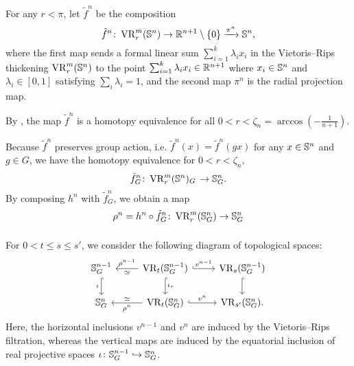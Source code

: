 For any $r<\pi$, let $\tilde{f}^n$ be the composition
\[
    \tilde{f}^n \colon \operatorname{VR}_r^m(\mathbb{S}^n) \to \mathbb{R}^{n+1} \setminus \{0\} \xrightarrow{\pi^n} \mathbb{S}^n,
\]
where the first map sends a formal linear sum $\sum_{i=1}^k \lambda_i x_i$ in the Vietoris--Rips thickening $\operatorname{VR}_r^m(\mathbb{S}^n)$ to the point $\sum_{i=1}^k \lambda_i x_i \in \mathbb{R}^{n+1}$ where $x_i \in \mathbb{S}^n$ and $\lambda_i \in [0,1]$ satisfying $\sum_i\lambda_i=1$, and the second map $\pi^n$ is the radial projection map.

By \cite[Proposition 5.3]{adamaszek2018metric}, the map $\tilde{f}^n$ is a homotopy equivalence for all $0<r<\zeta_n=\arccos{(-\tfrac{1}{n+1})}$.


Because $\tilde{f}^n$ preserves group action, i.e. $\tilde{f}^n(x) = \tilde{f}^n(gx)$ for any $x\in \mathbb{S}^n$ and $g\in G$, we have the homotopy equivalence for $0<r<\zeta_n$, %
\[
\tilde{f}^n_G \colon 
\operatorname{VR}_r^m(\mathbb{S}^n)_G \, 
\to \mathbb{S}^n_G.
\]
By composing $h^n$ with $\tilde{f}^n_G$, we obtain a map 
\[
\rho^n = h^n \circ \tilde{f}^n_G 
\colon \operatorname{VR}_r^m(\mathbb{S}^n_G) \to \mathbb{S}^n_G
\]

\subsubsection{} 

For $0<t\leq s \leq s'$, we consider the following diagram of topological spaces:
\begin{equation}\label{d:fundamental_bars_diagram}
    \begin{tikzcd}
        \bS^{n-1}_G
        \ar[d, hook,"{\iota}" left]
        &
        \VR_t(\bS^{n-1}_G)
        \ar[d, hook,"\iota_r"]
        \ar[l, "\rho^{n-1}" above, "\simeq" below]
        \ar[r, hook, "v^{n-1}"]
        &
        \VR_{s}(\bS^{n-1}_G)
        \ar[d, hook]
        \\
        \bS^{n}_G
        &
        \VR_t(\bS^{n}_G)
        \ar[l, "\rho^n" below, "\simeq" above]
        \ar[r, hook, "v^{n}"]
        &
        \VR_{s'}(\bS^{n}_G).
    \end{tikzcd}
\end{equation}
Here, the horizontal inclusions $v^{n-1}$ and $v^n$ are induced by the Vietoris--Rips filtration, whereas the vertical maps are induced by the equatorial inclusion of real projective spaces $\iota \colon \mathbb{S}^{n-1}_G \hookrightarrow \mathbb{S}^{n}_G$.

